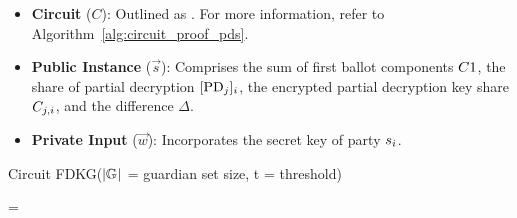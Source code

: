 \documentclass[runningheads]{llncs}
\begin{document}
\subsubsection{}\label{sec:proof-pds}

\begin{itemize}
    \item \textbf{Circuit} ($C$): Outlined as \ProofPDSInformal{}. For more information, refer to Algorithm~\ref{alg:circuit_proof_pds}.
    \item \textbf{Public Instance} ($\vec{s}$): Comprises the sum of first ballot components $C1{}$, the share of partial decryption $[\mathrm{PD}_{j}]_{i}$, the encrypted partial decryption key share $C_{j,i}$, and the difference $\Delta$.
    \item \textbf{Private Input} ($\vec{w}$): Incorporates the secret key of party $s_{i}$.
\end{itemize}


\begin{algorithm}[H]
\caption{Circuit FDKG($|\mathbb{G}_{}|$ = guardian set size, t = threshold)}
\label{alg:circuit_fdkg}






\BlankLine

\Assert {} = \;

\end{algorithm}
\end{document}

